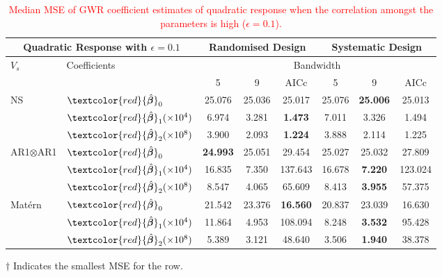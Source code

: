 \documentclass[a4paper]{article} 	%
\newcommand{\Matern}{Mat\'ern }
\newcommand{\zc}[1]{\textcolor{red}{#1}}
\begin{document}
\begin{table}[!htp]
	\centering
\begin{threeparttable}
	\caption{\zc{Median MSE of GWR coefficient estimates of quadratic response when the correlation amongst the parameters is high ($\epsilon=0.1$).}}\label{tb:MSEquadraticHigh}
\begin{tabular}{ll|ccc|ccc}
\toprule
\multicolumn{2}{c}{Quadratic Response with $\epsilon=0.1$} & \multicolumn{3}{c}{Randomised Design} & \multicolumn{3}{c}{Systematic Design} \\ \midrule
\multirow{2}{*}{$V_s$} & \multirow{2}{*}{Coefficients}  & \multicolumn{6}{c}{Bandwidth}\\ 
		  &  & 5  & 9  & AICc & 5  & 9  & AICc \\ \midrule
\multirow{3}{*}{NS} & $\zc{\hat{\bm{\beta}}}_0$  & 25.076 & 25.036 & 25.017    & 25.076 & \bf{25.006}\tnote{$\dagger$} & 25.013      \\
&$\zc{\hat{\bm{\beta}}}_1 (\times 10^4)$  & 6.974  & 3.281  &  \bf{1.473}\tnote{$\dagger$} & 7.011  & 3.326  & 1.494      \\
&$\zc{\hat{\bm{\beta}}}_2 (\times 10^8)$  & 3.900  & 2.093  & \bf{1.224}\tnote{$\dagger$}  & 3.888  & 2.114  & 1.225\\  \midrule
\multirow{3}{*}{AR1$\otimes$AR1} & $\zc{\hat{\bm{\beta}}}_0$ & \bf{24.993}\tnote{$\dagger$} & 25.051 & 29.454    & 25.027 & 25.032 & 27.809\\
& $\zc{\hat{\bm{\beta}}}_1 (\times 10^4)$ & 16.835 & 7.350  & 137.643   & 16.678 & \bf{7.220}\tnote{$\dagger$}  & 123.024  \\
& $\zc{\hat{\bm{\beta}}}_2 (\times 10^8)$  & 8.547  & 4.065  & 65.609    & 8.413  & \bf{3.955}\tnote{$\dagger$} & 57.375      \\  \midrule
\multirow{3}{*}{\Matern} & $\zc{\hat{\bm{\beta}}}_0$ & 21.542 & 23.376 & \bf{16.560}\tnote{$\dagger$}  & 20.837 & 23.039 & 16.630    \\
& $\zc{\hat{\bm{\beta}}}_1 (\times 10^4)$ & 11.864 & 4.953  & 108.094   & 8.248  & \bf{3.532}\tnote{$\dagger$}  & 95.428   \\
& $\zc{\hat{\bm{\beta}}}_2 (\times 10^8)$  & 5.389  & 3.121  & 48.640    & 3.506  & \bf{1.940}\tnote{$\dagger$}  & 38.378    \\ \bottomrule
\end{tabular}
\begin{tablenotes}
\item[$\dagger$] \footnotesize Indicates the smallest MSE for the row.
\end{tablenotes}
\end{threeparttable}
\end{table}
\end{document}
